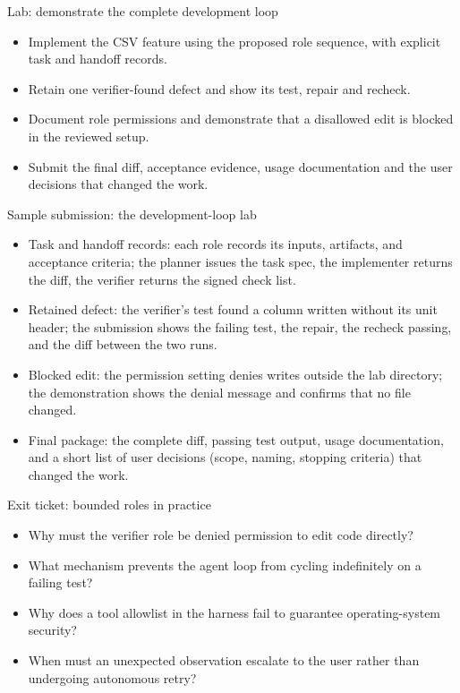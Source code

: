 \documentclass[aspectratio=169,11pt]{beamer}
\begin{document}
\begin{frame}[t,fragile]{Lab: demonstrate the complete development loop}
\fontsize{11.5}{14}\selectfont
\begin{itemize}\setlength{\itemsep}{2mm}
\item Implement the CSV feature using the proposed role sequence, with explicit task and handoff records.
\item Retain one verifier-found defect and show its test, repair and recheck.
\item Document role permissions and demonstrate that a disallowed edit is blocked in the reviewed setup.
\item Submit the final diff, acceptance evidence, usage documentation and the user decisions that changed the work.
\end{itemize}
\end{frame}
\begin{frame}[t,fragile]{Sample submission: the development-loop lab}
\fontsize{11.5}{14}\selectfont
\begin{itemize}\setlength{\itemsep}{2mm}
\item Task and handoff records: each role records its inputs, artifacts, and acceptance criteria; the planner issues the task spec, the implementer returns the diff, the verifier returns the signed check list.
\item Retained defect: the verifier's test found a column written without its unit header; the submission shows the failing test, the repair, the recheck passing, and the diff between the two runs.
\item Blocked edit: the permission setting denies writes outside the lab directory; the demonstration shows the denial message and confirms that no file changed.
\item Final package: the complete diff, passing test output, usage documentation, and a short list of user decisions (scope, naming, stopping criteria) that changed the work.
\end{itemize}
\end{frame}
\begin{frame}[t,fragile]{Exit ticket: bounded roles in practice}
\fontsize{11.5}{14}\selectfont
\begin{itemize}\setlength{\itemsep}{2mm}
\item Why must the verifier role be denied permission to edit code directly?
\item What mechanism prevents the agent loop from cycling indefinitely on a failing test?
\item Why does a tool allowlist in the harness fail to guarantee operating-system security?
\item When must an unexpected observation escalate to the user rather than undergoing autonomous retry?
\end{itemize}
\end{frame}
\end{document}
